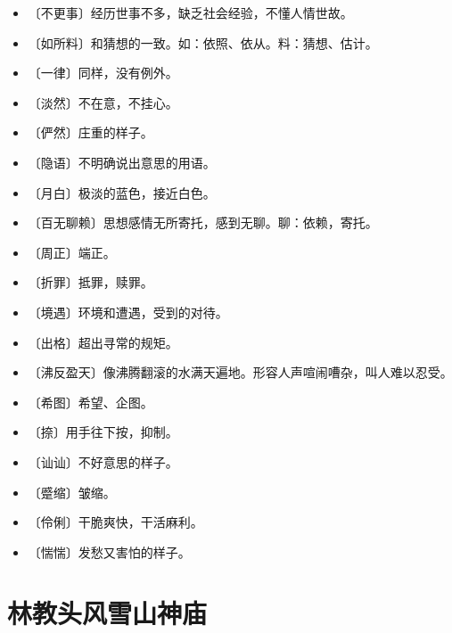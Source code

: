\documentclass[12pt,UTF-8,openany]{ctexbook}
\begin{document}
\begin{itemize}
    \setlength\itemsep{-0.2em}
    \item 〔不更事〕经历世事不多，缺乏社会经验，不懂人情世故。
    \item 〔如所料〕和猜想的一致。如：依照、依从。料：猜想、估计。
    \item 〔一律〕同样，没有例外。
    \item 〔淡然〕不在意，不挂心。
    \item 〔俨然〕庄重的样子。
    \item 〔隐语〕不明确说出意思的用语。
    \item 〔月白〕极淡的蓝色，接近白色。
    \item 〔百无聊赖〕思想感情无所寄托，感到无聊。聊：依赖，寄托。
    \item 〔周正〕端正。
    \item 〔折罪〕抵罪，赎罪。
    \item 〔境遇〕环境和遭遇，受到的对待。
    \item 〔出格〕超出寻常的规矩。
    \item 〔沸反盈天〕像沸腾翻滚的水满天遍地。形容人声喧闹嘈杂，叫人难以忍受。
    \item 〔希图〕希望、企图。
    \item 〔捺〕用手往下按，抑制。
    \item 〔讪讪〕不好意思的样子。
    \item 〔蹙缩〕皱缩。
    \item 〔伶俐〕干脆爽快，干活麻利。
    \item 〔惴惴〕发愁又害怕的样子。
\end{itemize}

\chapter{林教头风雪山神庙}
\end{document}
